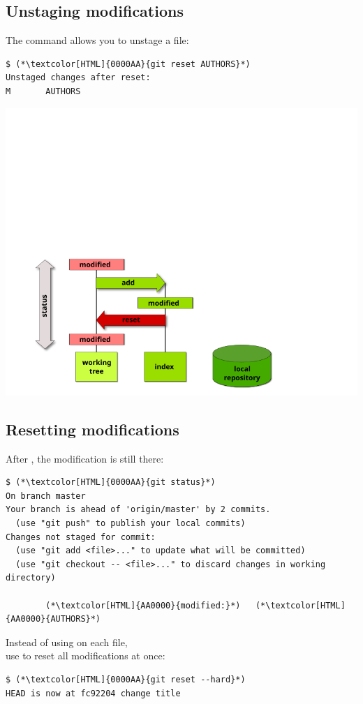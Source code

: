 \subsection{Unstaging modifications}
\begin{frame}[fragile]
\subslidetitle

  The command  allows you to unstage a file:

  \begin{lstlisting}
$ (*\textcolor[HTML]{0000AA}{git reset AUTHORS}*)
Unstaged changes after reset:
M       AUTHORS
\end{lstlisting}

  \vspace{1em}
  \centerline{\includegraphics{diagrams/undo-staged}}
\end{frame}


\subsection{Resetting modifications}
\begin{frame}[fragile]
\subslidetitle
  After , the modification is still there:
\begin{lstlisting}
$ (*\textcolor[HTML]{0000AA}{git status}*)
On branch master
Your branch is ahead of 'origin/master' by 2 commits.
  (use "git push" to publish your local commits)
Changes not staged for commit:
  (use "git add <file>..." to update what will be committed)
  (use "git checkout -- <file>..." to discard changes in working directory)

        (*\textcolor[HTML]{AA0000}{modified:}*)   (*\textcolor[HTML]{AA0000}{AUTHORS}*)
\end{lstlisting}

  Instead of using  on each file, \\
  use  to reset all modifications at once:
\begin{lstlisting}
$ (*\textcolor[HTML]{0000AA}{git reset --hard}*)
HEAD is now at fc92204 change title
\end{lstlisting}
\end{frame}

